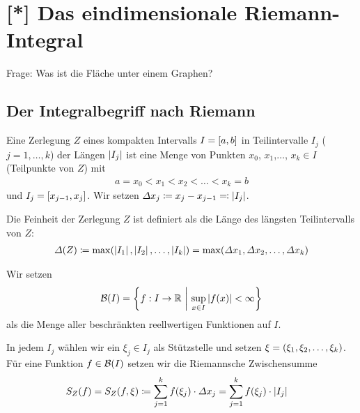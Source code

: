 \section{[*] Das eindimensionale Riemann-Integral}
\thispagestyle{pagenumberonly}

\marginnote{[16. Apr]}
Frage: Was ist die Fläche unter einem Graphen?


\subsection{Der Integralbegriff nach Riemann}

\begin{definition}[Zerlegung]
    Eine Zerlegung $Z$ eines kompakten Intervalls $I=\left[a,b\right]$ in Teilintervalle $I_j$ ($j=1,\dots, k$) der Längen $\left\lvert I_j\right\rvert$ ist eine Menge von Punkten $x_0$, $x_1$,$\dots$, $x_k\in I$ (Teilpunkte von $Z$) mit
    \begin{align*}
        a=x_0 < x_1 < x_2 < \dots < x_k = b
    \end{align*}
    und $I_j = \left[x_{j-1}, x_j\right]$. Wir setzen $\varDelta x_j \coloneqq x_j - x_{j-1} \eqqcolon\left\lvert I_j\right\rvert$.
\end{definition}

\begin{definition}
    Die Feinheit der Zerlegung $Z$ ist definiert als die Länge des längsten Teilintervalls von $Z$:
    \begin{align*}
        \varDelta\of{Z}\definedas \max\of{\abs{I_1}, \abs{I_2}, \dots, \abs{I_k}} = \max\of{\varDelta x_1, \varDelta x_2, \dots, \varDelta x_k}
    \end{align*}
\end{definition}

\begin{notation}
    Wir setzen
    \begin{align*}
        \mB\of{I} = \set{f: I\fromto \R~\middle\vert~\sup_{x\in I} \abs{f(x)} < \infty}
    \end{align*}
    als die Menge aller beschränkten reellwertigen Funktionen auf $I$.
\end{notation}

\begin{definition}
    In jedem $I_j$ wählen wir ein $\xi_j\in I_j$ als Stützstelle und setzen $\xi=\left(\xi_1, \xi_2, \dots, \xi_k\right)$. Für eine Funktion $f\in \mB\of{I}$ setzen wir die Riemannsche Zwischensumme
    \begin{align*}
        S_Z\of{f} &= S_Z\of{f, \xi} \definedas \sum_{j=1}^{k} f\of{\xi_j}\cdot\varDelta x_j = \sum_{j=1}^{k} f\of{\xi_j}\cdot\abs{I_j}
    \end{align*}
\end{definition}

